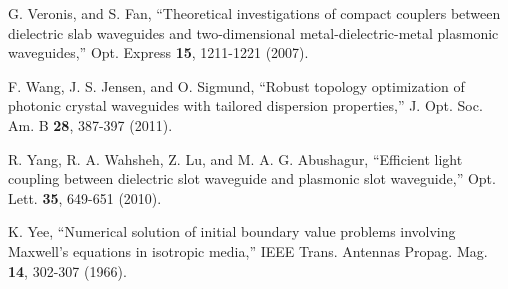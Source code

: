 \begin{thebibliography}{99}
 G. Veronis, and S. Fan, 
    ``Theoretical investigations of compact couplers between dielectric slab 
    waveguides and two-dimensional metal-dielectric-metal plasmonic waveguides,'' 
    Opt. Express \textbf{15}, 1211-1221 (2007).

 F. Wang, J. S. Jensen, and O. Sigmund, ``Robust topology optimization of photonic crystal waveguides with tailored dispersion properties,'' J. Opt. Soc. Am. B \textbf{28}, 387-397 (2011).

 R. Yang, R. A. Wahsheh, Z. Lu, and M. A. G. Abushagur, 
    ``Efficient light coupling between dielectric slot waveguide and plasmonic
    slot waveguide,'' Opt. Lett. \textbf{35}, 649-651 (2010).

 K. Yee, ``Numerical solution of initial boundary value problems involving Maxwell’s equations in isotropic media,'' IEEE Trans. Antennas Propag. Mag. \textbf{14}, 302-307 (1966).


\end{thebibliography}
